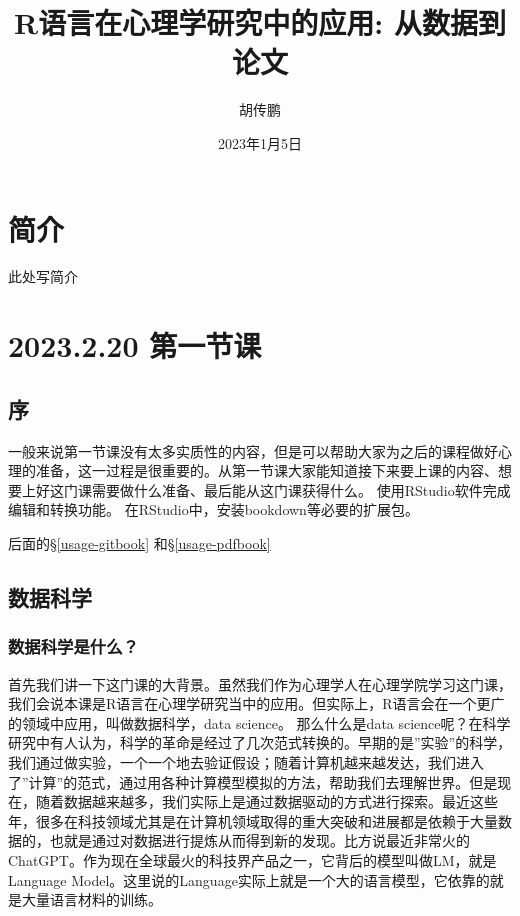 \documentclass[
  oneside]{book}
\title{R语言在心理学研究中的应用: 从数据到论文}
\author{胡传鹏}
\date{2023年1月5日}
\theoremstyle{definition}
\theoremstyle{definition}
\theoremstyle{definition}
\theoremstyle{definition}
\theoremstyle{remark}
\begin{document}
\maketitle

{
\setcounter{tocdepth}{1}
\tableofcontents
}
\hypertarget{ux7b80ux4ecb}{%
\chapter*{简介}\label{ux7b80ux4ecb}}

此处写简介

\hypertarget{lesson-1}{%
\chapter{2023.2.20 第一节课}\label{lesson-1}}

\hypertarget{1-intro}{%
\section{序}\label{1-intro}}

一般来说第一节课没有太多实质性的内容，但是可以帮助大家为之后的课程做好心理的准备，这一过程是很重要的。从第一节课大家能知道接下来要上课的内容、想要上好这门课需要做什么准备、最后能从这门课获得什么。
使用RStudio软件完成编辑和转换功能。
在RStudio中，安装bookdown等必要的扩展包。

后面的§\ref{usage-gitbook} 和§\ref{usage-pdfbook}

\hypertarget{1-data-science}{%
\section{数据科学}\label{1-data-science}}

\hypertarget{1-data-science-what}{%
\subsection{数据科学是什么？}\label{1-data-science-what}}

首先我们讲一下这门课的大背景。虽然我们作为心理学人在心理学院学习这门课，我们会说本课是R语言在心理学研究当中的应用。但实际上，R语言会在一个更广的领域中应用，叫做数据科学，data
science。 那么什么是data
science呢？在科学研究中有人认为，科学的革命是经过了几次范式转换的。早期的是''实验''的科学，我们通过做实验，一个一个地去验证假设；随着计算机越来越发达，我们进入了''计算''的范式，通过用各种计算模型模拟的方法，帮助我们去理解世界。但是现在，随着数据越来越多，我们实际上是通过数据驱动的方式进行探索。最近这些年，很多在科技领域尤其是在计算机领域取得的重大突破和进展都是依赖于大量数据的，也就是通过对数据进行提炼从而得到新的发现。比方说最近非常火的ChatGPT。作为现在全球最火的科技界产品之一，它背后的模型叫做LM，就是Language
Model。这里说的Language实际上就是一个大的语言模型，它依靠的就是大量语言材料的训练。
\end{document}
